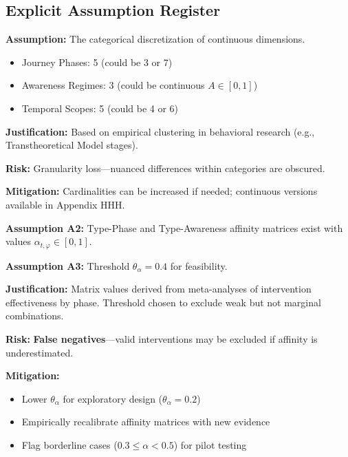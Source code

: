 \subsection{Explicit Assumption Register}

\begin{tcolorbox}[colback=yellow!5!white, colframe=yellow!75!black,
    title=\textbf{Assumption A1: Dimension Cardinalities}]
\textbf{Assumption:} The categorical discretization of continuous dimensions.

\begin{itemize}[nosep]
\item Journey Phases: 5 (could be 3 or 7)
\item Awareness Regimes: 3 (could be continuous $A \in [0,1]$)
\item Temporal Scopes: 5 (could be 4 or 6)
\end{itemize}

\textbf{Justification:} Based on empirical clustering in behavioral research (e.g., Transtheoretical Model stages).

\textbf{Risk:} Granularity loss---nuanced differences within categories are obscured.

\textbf{Mitigation:} Cardinalities can be increased if needed; continuous versions available in Appendix HHH.
\end{tcolorbox}

\begin{tcolorbox}[colback=yellow!5!white, colframe=yellow!75!black,
    title=\textbf{Assumptions A2--A3: Affinity Constraints}]
\textbf{Assumption A2:} Type-Phase and Type-Awareness affinity matrices exist with values $\alpha_{t,\varphi} \in [0,1]$.

\textbf{Assumption A3:} Threshold $\theta_\alpha = 0.4$ for feasibility.

\textbf{Justification:} Matrix values derived from meta-analyses of intervention effectiveness by phase. Threshold chosen to exclude weak but not marginal combinations.

\textbf{Risk:} \textbf{False negatives}---valid interventions may be excluded if affinity is underestimated.

\textbf{Mitigation:}
\begin{itemize}[nosep]
\item Lower $\theta_\alpha$ for exploratory design ($\theta_\alpha = 0.2$)
\item Empirically recalibrate affinity matrices with new evidence
\item Flag borderline cases ($0.3 \leq \alpha < 0.5$) for pilot testing
\end{itemize}
\end{tcolorbox}

